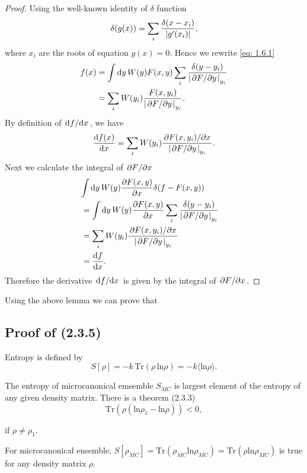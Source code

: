 \documentclass[10pt]{article}
\begin{document}
\begin{proof}
	Using the well-known identity of $\delta$ function
	\begin{equation}
		\delta(g(x)) = \sum_i \frac{\delta(x-x_i)}{\abs{g'(x_i)}},
	\end{equation}
	where $x_i$ are the roots of equation $g(x) = 0$.
	Hence we rewrite \eqref{eq: 1.6.1}
	\begin{align*}
		f(x) &= \int \dd{y} W(y) F(x,y) \sum_i \frac{\delta(y - y_i)}{\abs{\pdv*{F}{y}}_{y_i}} \\
		&= \sum_i W(y_i) \frac{F(x, y_i)}{\abs{\pdv*{F}{y}}_{y_i}}.
	\end{align*}
	By definition of $\dv*{f}{x}$, we have
	\begin{equation}
		\dv{f(x)}{x} = \sum_i W(y_i) \frac{\pdv*{F(x, y_i)}{x}}{\abs{\pdv*{F}{y}}_{y_i}}.
	\end{equation}
	Next we calculate the integral of $\pdv*{F}{x}$
	\begin{align*}
		\lefteqn{\int \dd{y} W(y) \pdv{F(x,y)}{x} \delta(f - F(x,y))} \\
		&= \int \dd{y} W(y) \pdv{F(x,y)}{x} \sum_i \frac{\delta(y - y_i)}{\abs{\pdv*{F}{y}}_{y_i}} \\
		&= \sum_i W(y_i) \frac{\pdv*{F(x, y_i)}{x}}{\abs{\pdv*{F}{y}}_{y_i}}\\
		&= \dv{f}{x}.
	\end{align*}
	Therefore the derivative $\dv*{f}{x}$ is given by the integral of $\pdv*{F}{x}$.
\end{proof}
Using the above lemma we can prove that

\subsection{Proof of (2.3.5)}

Entropy is defined by
\begin{equation}
	S[\rho] = -k \, \mathrm{Tr}(\rho \, \mathrm{ln}\rho) = -k \langle\mathrm{ln} \rho \rangle.
\end{equation}

The entropy of microcanonical emsemble $S_{MC}$ is largest element of the entropy of any given density matrix. There is a theorem (2.3.3)
\begin{equation}
	\mathrm{Tr}(\rho(\mathrm{ln} \rho_1 - \mathrm{ln} \rho)) < 0,
\end{equation}

if $\rho \neq \rho_1$.

For microcanonical ensemble, $S[\rho_{MC}] = \mathrm{Tr}(\rho_{MC} \mathrm{ln} \rho_{MC}) = \mathrm{Tr}(\rho \mathrm{ln} \rho_{MC})$ is true for any density matrix $\rho$.
\end{document}
